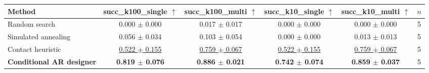 \begin{tabular}{lccccc}
\toprule
Method & succ\_k100\_single $\uparrow$ & succ\_k100\_multi $\uparrow$ & succ\_k10\_single $\uparrow$ & succ\_k10\_multi $\uparrow$ & $n$ \\
\midrule
Random search & 0.000 $\pm$ 0.000 & 0.017 $\pm$ 0.017 & 0.000 $\pm$ 0.000 & 0.000 $\pm$ 0.000 & 5 \\
Simulated annealing & 0.056 $\pm$ 0.034 & 0.103 $\pm$ 0.054 & 0.000 $\pm$ 0.000 & 0.013 $\pm$ 0.013 & 5 \\
Contact heuristic & \underline{0.522 $\pm$ 0.155} & \underline{0.759 $\pm$ 0.067} & \underline{0.522 $\pm$ 0.155} & \underline{0.759 $\pm$ 0.067} & 5 \\
\textbf{Conditional AR designer} & \textbf{0.819 $\pm$ 0.076} & \textbf{0.886 $\pm$ 0.021} & \textbf{0.742 $\pm$ 0.074} & \textbf{0.859 $\pm$ 0.037} & 5 \\
\bottomrule
\end{tabular}
